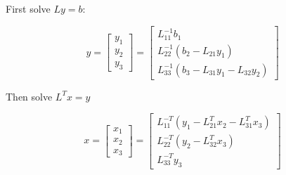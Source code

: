 \documentclass[
  letterpaper,
  DIV=11,
  numbers=noendperiod]{scrartcl}
\begin{document}
First solve \(Ly = b\):

\[
y = \begin{bmatrix}
y_1 \\
y_2 \\
y_3
\end{bmatrix} =
\begin{bmatrix}
 L_{11}^{-1}b_1 \\
L_{22}^{-1}\left(b_2 - L_{21}y_1\right) \\
L_{33}^{-1}\left(b_3 - L_{31}y_1 - L_{32}y_2\right)
\end{bmatrix}
\]

Then solve \(L^Tx = y\)

\[
x = \begin{bmatrix}
x_1 \\
x_2 \\
x_3
\end{bmatrix} =
\begin{bmatrix}
L_{11}^{-T}\left(y_1 - L_{21}^Tx_2 - L_{31}^Tx_3\right) \\
L_{22}^{-T}\left(y_2 - L_{32}^Tx_3\right) \\
L_{33}^{-T}y_3
\end{bmatrix}
\]
\end{document}
